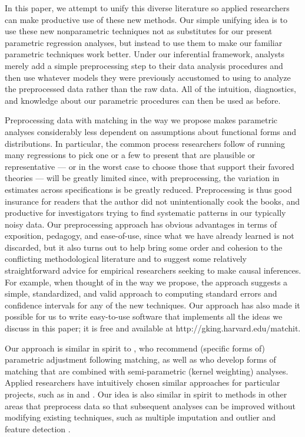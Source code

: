 \documentclass[11pt,titlepage]{article}
\begin{document}
In this paper, we attempt to unify this diverse literature so applied
researchers can make productive use of these new methods.  Our simple
unifying idea is to use these new nonparametric techniques not as
substitutes for our present parametric regression analyses, but
instead to use them to make our familiar parametric techniques work
better.  Under our inferential framework, analysts merely add a simple
preprocessing step to their data analysis procedures and then use
whatever models they were previously accustomed to using to analyze
the preprocessed data rather than the raw data.  All of the intuition,
diagnostics, and knowledge about our parametric procedures can then be
used as before.

Preprocessing data with matching in the way we propose makes
parametric analyses considerably less dependent on assumptions about
functional forms and distributions.  In particular, the common process
researchers follow of running many regressions to pick one or a few to
present that are plausible or representative --- or in the worst case
to choose those that support their favored theories --- will be
greatly limited since, with preprocessing, the variation in estimates
across specifications is be greatly reduced.  Preprocessing is thus
good insurance for readers that the author did not unintentionally
cook the books, and productive for investigators trying to find
systematic patterns in our typically noisy data.  Our preprocessing
approach has obvious advantages in terms of exposition, pedagogy, and
ease-of-use, since what we have already learned is not discarded, but
it also turns out to help bring some order and cohesion to the
conflicting methodological literature and to suggest some relatively
straightforward advice for empirical researchers seeking to make
causal inferences.  For example, when thought of in the way we
propose, the approach suggests a simple, standardized, and valid
approach to computing standard errors and confidence intervals for any
of the new techniques.  Our approach has also made it possible for us
to write easy-to-use software that implements all the ideas we discuss
in this paper; it is free and available at
http://gking.harvard.edu/matchit.

Our approach is similar in spirit to
\citet{AbaImb04,ImaDyk03,RosRub84a,RubTho00}, who recommend (specific
forms of) parametric adjustment following matching, as well as
\citet{HecIchTod98} who develop forms of matching that are combined
with semi-parametric (kernel weighting) analyses.  Applied researchers
have intuitively chosen similar approaches for particular projects,
such as in \citet{Rosenbaum86} and \citet{GlaLevMye03}.  Our idea is
also similar in spirit to methods in other areas that preprocess data
so that subsequent analyses can be improved without modifying existing
techniques, such as multiple imputation \citep{Rubin87,KinHonJos01}
and outlier and feature detection \citep[][Ch.8]{Bishop95}.
\end{document}
